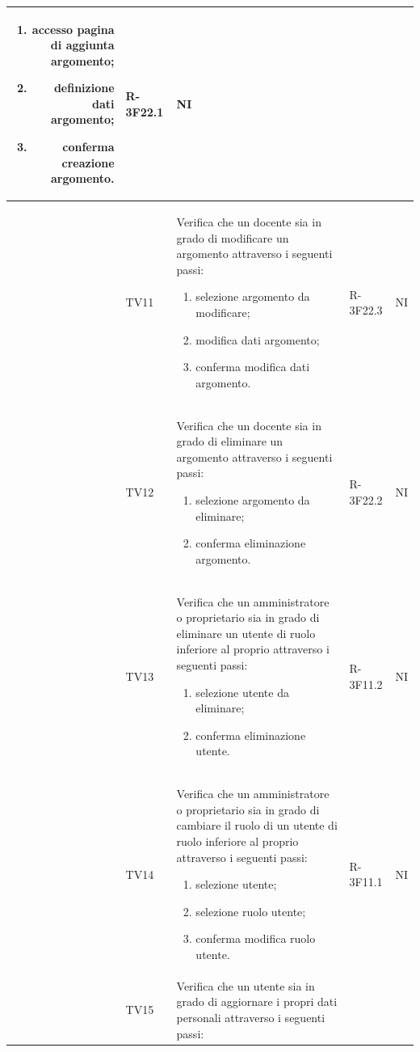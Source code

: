 \documentclass[12pt,a4paper]{article}
\begin{document}
\begin{longtable}{r l p{6cm} l l}
		\begin{enumerate}
			\item accesso pagina di aggiunta argomento;
			\item definizione dati argomento;
			\item conferma creazione argomento.
		\end{enumerate} & R-3F22.1 & NI\tabularnewline
		\midrule
		& TV11 & Verifica che un docente sia in grado di modificare un argomento attraverso i seguenti passi:
		
		\begin{enumerate}
			\item selezione argomento da modificare;
			\item modifica dati argomento;
			\item conferma modifica dati argomento.
		\end{enumerate} & R-3F22.3 & NI\tabularnewline
		\midrule
		& TV12 & Verifica che un docente sia in grado di eliminare un argomento attraverso i seguenti passi:
		
		\begin{enumerate}
			\item selezione argomento da eliminare;
			\item conferma eliminazione argomento.
		\end{enumerate} & R-3F22.2 & NI\tabularnewline
		\midrule
		& TV13 & Verifica che un amministratore o proprietario sia in grado di eliminare un utente di ruolo inferiore al proprio attraverso i seguenti passi:
		
		\begin{enumerate}
			\item selezione utente da eliminare;
			\item conferma eliminazione utente.
		\end{enumerate} & R-3F11.2 & NI\tabularnewline
		\midrule
		& TV14 & Verifica che un amministratore o proprietario sia in grado di cambiare il ruolo di un utente di ruolo inferiore al proprio attraverso i seguenti passi:
		
		\begin{enumerate}
			\item selezione utente;
			\item selezione ruolo utente;
			\item conferma modifica ruolo utente.
		\end{enumerate} & R-3F11.1 & NI\tabularnewline
		\midrule
		& TV15 & Verifica che un utente sia in grado di aggiornare i propri dati personali attraverso i seguenti passi:
		

\end{longtable}
\end{document}
